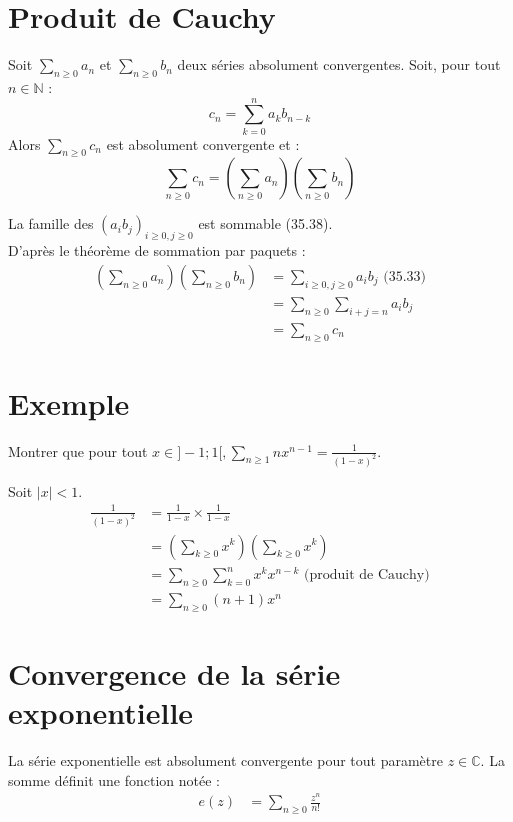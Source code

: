 \documentclass[../main.tex]{subfiles}
\begin{document}
\section{Produit de Cauchy}
\begin{tcolorbox}[title=Théorème 35.38, title filled=false, colframe=orange, colback=orange!10!white]
    Soit $\sum_{n \geq 0} a_n$ et $\sum_{n \geq 0} b_n$ deux séries absolument convergentes. Soit, pour tout $n \in \mathbb{N}$ :
    $$c_n=\sum_{k=0}^n a_k b_{n-k}$$
    Alors $\sum_{n \geq 0} c_n$ est absolument convergente et :
    $$\sum_{n \geq 0} c_n=\left(\sum_{n \geq 0} a_n\right)\left(\sum_{n \geq 0} b_n\right)$$
\end{tcolorbox}

\noindent La famille des $(a_i b_j)_{i\geq 0, j\geq 0}$ est sommable (35.38). \\
D'après le théorème de sommation par paquets : 
\begin{align*}
    \left( \sum_{n\geq 0} a_n \right) \left( \sum_{n\geq 0} b_n \right) &= \sum_{i\geq 0, j\geq 0} a_i b_j \text{ (35.33)} \\
    &= \sum_{n\geq 0} \sum_{i+j = n} a_i b_j \\
    &= \sum_{n\geq 0} c_n
\end{align*}

\section{Exemple}
\begin{tcolorbox}[title=Exemple 35.39, title filled=false, colframe=darkgreen, colback=darkgreen!10!white]
    Montrer que pour tout $x\in ]-1; 1[, \sum\limits_{n\geq 1} nx^{n-1} = \frac{1}{(1-x)^2}$.
\end{tcolorbox}

\noindent Soit $|x| < 1$. 
\begin{align*}
    \frac{1}{(1 - x)^2} &= \frac{1}{1 - x} \times \frac{1}{1 - x} \\
    &= \left( \sum_{k\geq 0} x^k \right) \left( \sum_{k\geq 0} x^k \right) \\
    &= \sum_{n\geq 0} \sum_{k=0}^{n} x^k x^{n-k} \text{ (produit de Cauchy)} \\
    &= \sum_{n\geq 0} (n+1) x^n
\end{align*}

\section{Convergence de la série exponentielle}
\begin{tcolorbox}[title=Théorème 35.41, title filled=false, colframe=orange, colback=orange!10!white]
    La série exponentielle est absolument convergente pour tout paramètre $z\in \mathbb{C}$. La somme définit une fonction notée : 
    \begin{align*}
        e(z) &= \sum_{n\geq 0} \frac{z^n}{n!}
    \end{align*}
\end{tcolorbox}
\end{document}
